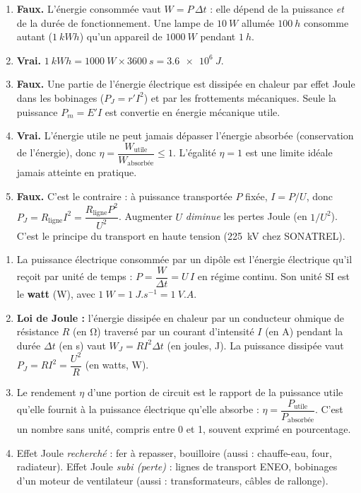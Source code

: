 \documentclass[11pt]{article}
\newcommand{\cle}[1]{{\popxbold\color{popdark}#1}}
\begin{document}
\begin{corrige}
\begin{enumerate}
\item \textbf{Faux.} L'énergie consommée vaut $W = P\,\Delta t$ : elle dépend de la puissance \emph{et} de la durée de fonctionnement. Une lampe de $\SI{10}{W}$ allumée $\SI{100}{h}$ consomme autant ($\SI{1}{kWh}$) qu'un appareil de $\SI{1000}{W}$ pendant $\SI{1}{h}$.
\item \textbf{Vrai.} $\SI{1}{kWh} = \SI{1000}{W} \times \SI{3600}{s} = \SI{3,6e6}{J}$.
\item \textbf{Faux.} Une partie de l'énergie électrique est dissipée en chaleur par effet Joule dans les bobinages ($P_J = r' I^2$) et par les frottements mécaniques. Seule la puissance $P_m = E' I$ est convertie en énergie mécanique utile.
\item \textbf{Vrai.} L'énergie utile ne peut jamais dépasser l'énergie absorbée (conservation de l'énergie), donc $\eta = \dfrac{W_{\text{utile}}}{W_{\text{absorbée}}} \le 1$. L'égalité $\eta = 1$ est une limite idéale jamais atteinte en pratique.
\item \textbf{Faux.} C'est le contraire : à puissance transportée $P$ fixée, $I = P/U$, donc $P_J = R_{\text{ligne}} I^2 = \dfrac{R_{\text{ligne}} P^2}{U^2}$. Augmenter $U$ \emph{diminue} les pertes Joule (en $1/U^2$). C'est le principe du transport en haute tension (\SI{225}{kV} chez SONATREL).
\end{enumerate}
\end{corrige}

\begin{corrige}
\begin{enumerate}
\item La \cle{puissance électrique} consommée par un dipôle est l'énergie électrique qu'il reçoit par unité de temps : $P = \dfrac{W}{\Delta t} = U\,I$ en régime continu. Son unité SI est le \textbf{watt} (\si{W}), avec $\SI{1}{W} = \SI{1}{J.s^{-1}} = \SI{1}{V.A}$.
\item \textbf{Loi de Joule :} l'énergie dissipée en chaleur par un conducteur ohmique de résistance $R$ (en \si{\ohm}) traversé par un courant d'intensité $I$ (en \si{A}) pendant la durée $\Delta t$ (en \si{s}) vaut $W_J = R I^2 \Delta t$ (en joules, \si{J}). La puissance dissipée vaut $P_J = R I^2 = \dfrac{U^2}{R}$ (en watts, \si{W}).
\item Le \cle{rendement} $\eta$ d'une portion de circuit est le rapport de la puissance utile qu'elle fournit à la puissance électrique qu'elle absorbe : $\eta = \dfrac{P_{\text{utile}}}{P_{\text{absorbée}}}$. C'est un nombre sans unité, compris entre 0 et 1, souvent exprimé en pourcentage.
\item Effet Joule \emph{recherché} : fer à repasser, bouilloire (aussi : chauffe-eau, four, radiateur). Effet Joule \emph{subi (perte)} : lignes de transport ENEO, bobinages d'un moteur de ventilateur (aussi : transformateurs, câbles de rallonge).
\end{enumerate}
\end{corrige}
\end{document}
